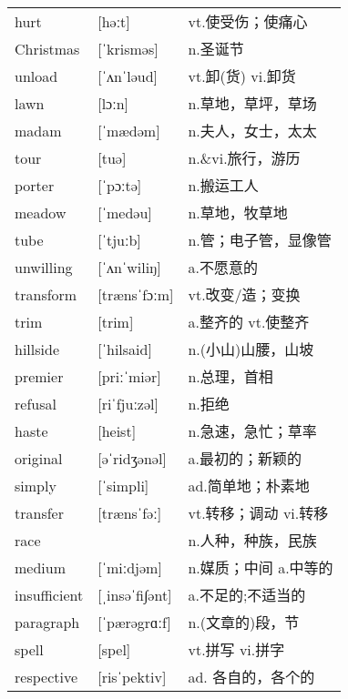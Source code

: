 \documentclass[a4paper]{article}
\begin{document}
\section{}
\begin{tabular}{l l l}

hurt & [həːt] & vt.使受伤；使痛心 \\
Christmas & [ˈkrisməs] & n.圣诞节 \\
unload & [ˈʌnˈləud] & vt.卸(货) vi.卸货 \\
lawn & [lɔːn] & n.草地，草坪，草场 \\
madam & [ˈmædəm] & n.夫人，女士，太太 \\
tour & [tuə] & n.\&vi.旅行，游历 \\
porter & [ˈpɔːtə] & n.搬运工人 \\
meadow & [ˈmedəu] & n.草地，牧草地 \\
tube & [ˈtjuːb] & n.管；电子管，显像管 \\
unwilling & [ˈʌnˈwiliŋ] & a.不愿意的 \\
transform & [trænsˈfɔːm] & vt.改变/造；变换 \\
trim & [trim] & a.整齐的 vt.使整齐 \\
hillside & [ˈhilsaid] & n.(小山)山腰，山坡 \\
premier & [priːˈmiər] & n.总理，首相 \\
refusal & [riˈfjuːzəl] & n.拒绝 \\
haste & [heist] & n.急速，急忙；草率 \\
original & [əˈridʒənəl] & a.最初的；新颖的 \\
simply & [ˈsimpli] & ad.简单地；朴素地 \\
transfer & [trænsˈfəː] & vt.转移；调动 vi.转移 \\
race &  & n.人种，种族，民族 \\
medium & [ˈmiːdjəm] & n.媒质；中间 a.中等的 \\
insufficient & [ˌinsəˈfi∫ənt] & a.不足的;不适当的 \\
paragraph & [ˈpærəgrɑːf] & n.(文章的)段，节 \\
spell & [spel] & vt.拼写 vi.拼字 \\
respective & [risˈpektiv] & ad. 各自的，各个的 \\

\end{tabular}
\end{document}
